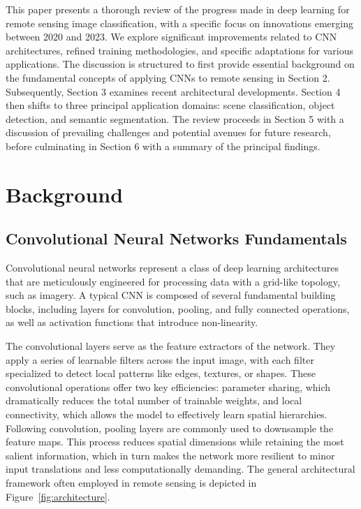 \documentclass[12pt,a4paper]{article}
\begin{document}
This paper presents a thorough review of the progress made in deep learning for remote sensing image classification, with a specific focus on innovations emerging between 2020 and 2023. We explore significant improvements related to CNN architectures, refined training methodologies, and specific adaptations for various applications. The discussion is structured to first provide essential background on the fundamental concepts of applying CNNs to remote sensing in Section 2. Subsequently, Section 3 examines recent architectural developments. Section 4 then shifts to three principal application domains: scene classification, object detection, and semantic segmentation. The review proceeds in Section 5 with a discussion of prevailing challenges and potential avenues for future research, before culminating in Section 6 with a summary of the principal findings.

\section{Background}
\label{sec:background}

\subsection{Convolutional Neural Networks Fundamentals}
Convolutional neural networks represent a class of deep learning architectures that are meticulously engineered for processing data with a grid-like topology, such as imagery. A typical CNN is composed of several fundamental building blocks, including layers for convolution, pooling, and fully connected operations, as well as activation functions that introduce non-linearity.

The convolutional layers serve as the feature extractors of the network. They apply a series of learnable filters across the input image, with each filter specialized to detect local patterns like edges, textures, or shapes. These convolutional operations offer two key efficiencies: parameter sharing, which dramatically reduces the total number of trainable weights, and local connectivity, which allows the model to effectively learn spatial hierarchies. Following convolution, pooling layers are commonly used to downsample the feature maps. This process reduces spatial dimensions while retaining the most salient information, which in turn makes the network more resilient to minor input translations and less computationally demanding. The general architectural framework often employed in remote sensing is depicted in Figure~\ref{fig:architecture}.
\end{document}
